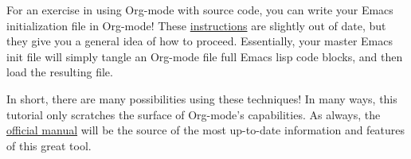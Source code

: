 \documentclass[11pt]{article}
\begin{document}
For an exercise in using Org-mode with source code, you can write your
Emacs initialization file in Org-mode! These \href{http://orgmode.org/worg/org-contrib/babel/intro.html#sec-8-2-1}{instructions} are slightly
out of date, but they give you a general idea of how to
proceed. Essentially, your master Emacs init file will simply tangle
an Org-mode file full Emacs lisp code blocks, and then load the
resulting file.

In short, there are many possibilities using these techniques! In many
ways, this tutorial only scratches the surface of Org-mode's
capabilities. As always, the \href{http://orgmode.org/manual/index.html#Top}{official manual} will be the source of the
most up-to-date information and features of this great tool.
\end{document}
